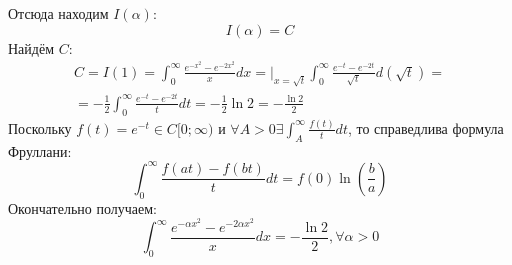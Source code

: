\documentclass[11pt]{article}
\begin{document}
Отсюда находим \(I(\alpha)\):
$$I(\alpha) = C$$
Найдём \(C\):
\begin{multline*}
C = I(1) = \int_0^\infty\frac{e^{-x^2} - e^{-2x^2}}xdx =\bigg|_{x = \sqrt t}\int_0^\infty\frac{e^{-t} - e^{-2t}}{\sqrt t}d(\sqrt t) = \\
= -\frac12\int_0^\infty\frac{e^{-t} - e^{-2t}}tdt = -\frac12\ln2 = -\frac{\ln2}2
\end{multline*}
Поскольку \(f(t) = e^{-t} \in C[0; \infty)\) и \(\forall A > 0 \exists \int_A^\infty\frac{f(t)}tdt\), то справедлива формула Фруллани:
$$\int_0^\infty\frac{f(at) - f(bt)}tdt = f(0)\ln\left(\frac ba\right)$$
Окончательно получаем:
$$\int_0^\infty\frac{e^{-\alpha x^2} - e^{-2\alpha x^2}}xdx = -\frac{\ln2}2, \forall \alpha > 0$$
\end{document}
